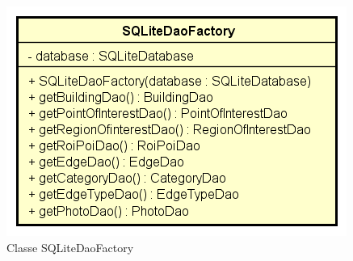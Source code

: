 \documentclass[../DefinizioneDiProdotto.tex]{subfiles}
\begin{document}
    \begin{figure}[H]
        \centering
        \includegraphics{img/SQLiteDaoFactory.png}
        \caption{Classe SQLiteDaoFactory}\label{fig:model::dataaccess::dao::SQLiteDaoFactory} 
    \end{figure}
\end{document}
